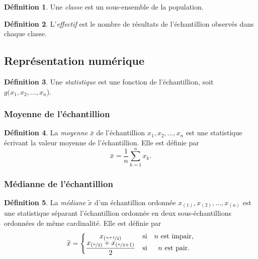 \documentclass[11pt]{article}
\makeatletter
\theoremstyle{remark}
\theoremstyle{definition}
\newtheorem*{@definition}{Définition}
\newenvironment{definition}{%
	\begin{@definition}%
}{%
	\end{@definition}%
	\setcounter{property}{0}%
}
\makeatother
\begin{document}
\begin{definition}
	Une \textit{classe} est un sous-ensemble de la population.
\end{definition}

\begin{definition}
	L'\textit{effectif} est le nombre de résultats de l'échantillion observés
	dans chaque classe.
\end{definition}


\subsection{Représentation numérique}
\begin{definition}
	Une \textit{statistique} est une fonction de l'échantillion, soit $g(x_1,
	x_2,\dots,x_n$).
\end{definition}

\subsubsection{Moyenne de l'échantillion}
\begin{definition}
	La \textit{moyenne} $\bar{x}$ de l'échantillion $x_1,x_2,\dots,x_n$ est une
	statistique écrivant la valeur moyenne de l'échantillion. Elle est définie
	par
	\begin{equation*}
		\bar{x}=\frac{1}{n}\sum_{k=1}^nx_k.
	\end{equation*}
\end{definition}

\subsubsection{Médianne de l'échantillion}
\begin{definition}
	La \textit{médiane} $\widetilde{x}$ d'un échantillion ordonnée $x_{(1)},
	x_{(2)},\dots,x_{(n)}$ est une statistique séparant l'échantillion
	ordonnée en deux sous-échantillions ordonnées de même cardinalité. Elle 
	est définie par
	\begin{equation*}
		\widetilde{x}=\left\{
			\begin{matrix}
				x_{(\nicefrac{n+1}{2})} & \text{si} & \text{$n$ est impair},\\
				\dfrac{
					x_{(\nicefrac{n}{2})}+
					x_{(\nicefrac{n}{2}+1)}
				}{2} & \text{si} & \text{$n$ est pair}.\\
			\end{matrix}
		\right.
	\end{equation*}
\end{definition}
\end{document}
